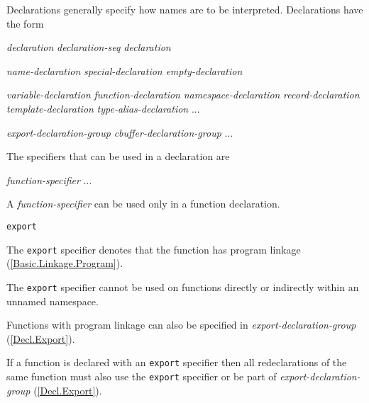 \p Declarations generally specify how names are to be interpreted. Declarations have the form
\begin{grammar}
  \br
  \textit{declaration}\br
  \textit{declaration-seq declaration}

  \br
  \textit{name-declaration}\br
  \textit{special-declaration}\br
  \textit{empty-declaration}

  \br
  \textit{variable-declaration}\br
  \textit{function-declaration}\br
  \textit{namespace-declaration}\br
  \textit{record-declaration}\br
  \textit{template-declaration}\br
  \textit{type-alias-declaration}\br
  ...

  \br
  \textit{export-declaration-group}\br
  \textit{cbuffer-declaration-group}\br
  ...

   \terminal{;}

\end{grammar}

\p The specifiers that can be used in a declaration are
\begin{grammar}
  \br
  \textit{function-specifier}\br
  ...
\end{grammar}


\p A \textit{function-specifier} can be used only in a function declaration.

\begin{grammar}
  \br
  \texttt{export}\br
\end{grammar}

\p The \texttt{export} specifier denotes that the function has program linkage (\ref{Basic.Linkage.Program}).

\p The \texttt{export} specifier cannot be used on functions directly or indirectly within an unnamed namespace.

\p Functions with program linkage can also be specified in \textit{export-declaration-group} (\ref{Decl.Export}).

\p If a function is declared with an \texttt{export} specifier then all redeclarations of the same function must also use the \texttt{export} specifier or be part of \textit{export-declaration-group} (\ref{Decl.Export}).


